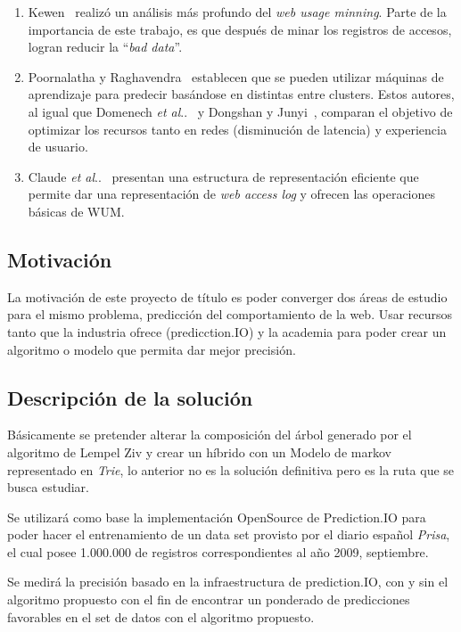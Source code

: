 \documentclass{udparticle}
\makeatletter
\DeclareRobustCommand\onedot{\futurelet\@let@token\@onedot}
\newcommand\@onedot{\ifx\@let@token.\else.\null\fi\xspace}
\newcommand\etal{\emph{et al}\onedot}
\makeatother
\begin{document}
\begin{enumerate}
  \item Kewen~\cite{kewen2012} realizó un análisis más profundo del \emph{web usage minning}.
  Parte de la importancia de este trabajo, es que después de minar los registros de accesos, logran reducir la ``\emph{bad data}''.

  \item Poornalatha y Raghavendra~\cite{Poornalatha2012} establecen que se pueden utilizar máquinas de aprendizaje para predecir basándose en distintas entre clusters. Estos autores, al igual que Domenech \etal~\cite{Domenech2006} y Dongshan y Junyi~\cite{Dongshan2002}, comparan el objetivo de optimizar los recursos tanto en redes (disminución de latencia) y experiencia de usuario.

  \item Claude \etal~\cite{Claude2014} presentan una estructura de representación eficiente que permite dar una representación de \emph{web access log} y ofrecen las operaciones básicas de WUM.
\end{enumerate}


\subsection{Motivación}

La motivación de este proyecto de título es poder converger dos áreas de estudio para el mismo problema, predicción del comportamiento de la web. Usar recursos tanto que la industria ofrece (predicction.IO) y la academia para poder crear un algoritmo o modelo que permita dar mejor precisión.


\subsection{Descripción de la solución }

Básicamente se pretender alterar la composición del árbol generado por el algoritmo de Lempel Ziv y crear un híbrido con un Modelo de markov representado en \emph{Trie}, lo anterior no es la solución definitiva pero es la ruta que se busca estudiar.

Se utilizará como base la implementación OpenSource de Prediction.IO para poder hacer el entrenamiento de un data set provisto por el diario español \emph{Prisa}, el cual posee 1.000.000 de registros correspondientes al año 2009, septiembre.

Se medirá la precisión basado en la infraestructura de prediction.IO, con  y sin el algoritmo propuesto con el fin de encontrar un ponderado de predicciones favorables en el set de datos con el algoritmo propuesto.
\end{document}

